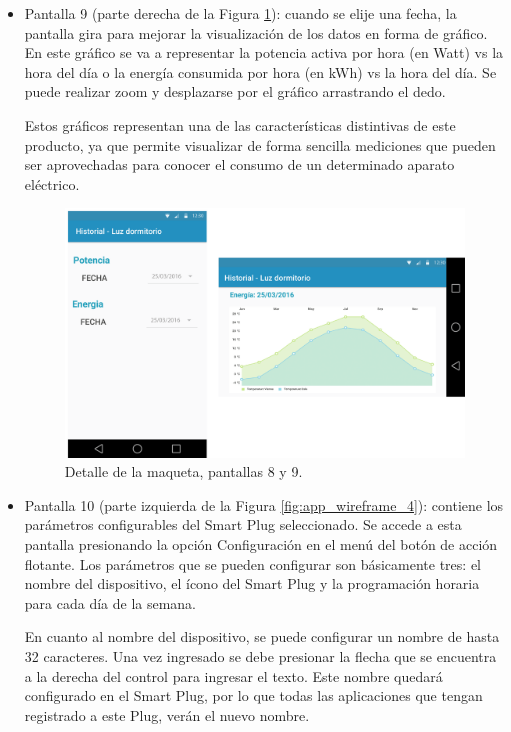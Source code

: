 \begin{itemize}
\item Pantalla 9 (parte derecha de la Figura \ref{fig:app_wireframe_3}): cuando se elije una fecha, la pantalla gira para mejorar la visualización de los datos en forma de gráfico. En este gráfico se va a representar la potencia activa por hora (en Watt) vs la hora del día o la energía consumida por hora (en kWh) vs la hora del día. Se puede realizar zoom y desplazarse por el gráfico arrastrando el dedo.

Estos gráficos representan una de las características distintivas de este producto, ya que permite visualizar de forma sencilla mediciones que pueden ser aprovechadas para conocer el consumo de un determinado aparato eléctrico.


\begin{figure}[!h]
	\centering
	\includegraphics[width=14cm]{./Figures/3_3_1_app_wireframe_3.png}
	\caption{Detalle de la maqueta, pantallas 8 y 9.}
	\label{fig:app_wireframe_3}
\end{figure}


\item Pantalla 10 (parte izquierda de la Figura \ref{fig:app_wireframe_4}): contiene los parámetros configurables del Smart Plug seleccionado. Se accede a esta pantalla presionando la opción Configuración en el menú del botón de acción flotante. Los parámetros que se pueden configurar son básicamente tres: el nombre del dispositivo, el ícono del Smart Plug y la programación horaria para cada día de la semana.

En cuanto al nombre del dispositivo, se puede configurar un nombre de hasta 32 caracteres. Una vez ingresado se debe presionar la flecha que se encuentra a la derecha del control para ingresar el texto. Este nombre quedará configurado en el Smart Plug, por lo que todas las aplicaciones que tengan registrado a este Plug, verán el nuevo nombre.


\end{itemize}
